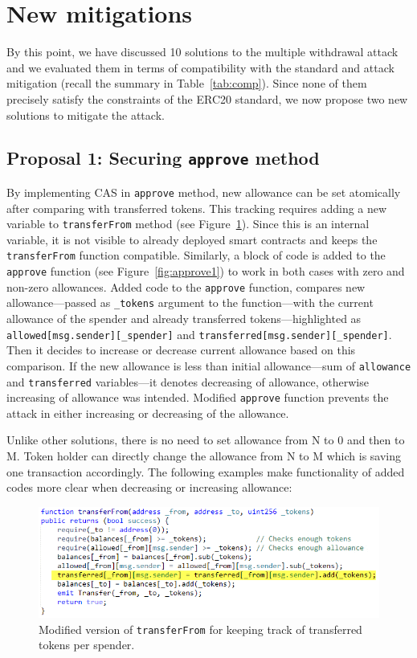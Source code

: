 
\section{New mitigations}

By this point, we have discussed 10 solutions to the multiple withdrawal attack and we evaluated them in terms of compatibility with the standard and attack mitigation (recall the summary in Table~\ref{tab:comp}). Since none of them precisely satisfy the constraints of the ERC20 standard, we now propose two new solutions to mitigate the attack.

\subsection{Proposal 1: Securing \texttt{approve} method}

By implementing CAS \cite{Ref06} in \texttt{approve} method, new allowance can be set atomically after comparing with transferred tokens. This tracking requires adding a new variable to \texttt{transferFrom} method (see Figure~\ref{fig:transfer1}). Since this is an internal variable, it is not visible to already deployed smart contracts and keeps the \texttt{transferFrom} function compatible. Similarly, a block of code is added to the \texttt{approve} function (see Figure~\ref{fig:approve1}) to work in both cases with zero and non-zero allowances. Added code to the \texttt{approve} function, compares new allowance---passed as \texttt{\_tokens} argument to the function---with the current allowance of the spender and already transferred tokens---highlighted as \texttt{allowed[msg.sender][\_spender]} and \texttt{transferred[msg.sender][\_spender]}. Then it decides to increase or decrease current allowance based on this comparison. If the new allowance is less than initial allowance---sum of \texttt{allowance} and \texttt{transferred} variables---it denotes decreasing of allowance, otherwise increasing of allowance was intended. Modified \texttt{approve} function prevents the attack in either increasing or decreasing of the allowance.

Unlike other solutions, there is no need to set allowance from N to 0 and then to M. Token holder can directly change the allowance from N to M which is saving one transaction accordingly. The following examples make functionality of added codes more clear when decreasing or increasing allowance:
 
\begin{figure}[t]
	\centering
	\includegraphics[width=1.0\linewidth]{figures/multiple_withdrawal_14.png}
	\caption{Modified version of \texttt{transferFrom} for keeping track of transferred tokens per spender.\label{fig:transfer1}}
\end{figure}

